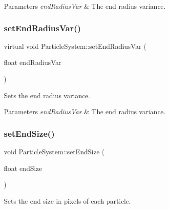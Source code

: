 \begin{DoxyParams}{Parameters}
{\em end\+Radius\+Var} & The end radius variance. \\
\hline
\end{DoxyParams}
\mbox{\label{classParticleSystem_ac342662b4a04cda94275239f9a810f73}} 
\subsubsection{\texorpdfstring{set\+End\+Radius\+Var()}{setEndRadiusVar()}\hspace{0.1cm}{\footnotesize\ttfamily [2/2]}}
{\footnotesize\ttfamily virtual void Particle\+System\+::set\+End\+Radius\+Var (\begin{DoxyParamCaption}\item[{float}]{end\+Radius\+Var }\end{DoxyParamCaption})\hspace{0.3cm}{\ttfamily [virtual]}}

Sets the end radius variance.


\begin{DoxyParams}{Parameters}
{\em end\+Radius\+Var} & The end radius variance. \\
\hline
\end{DoxyParams}
\mbox{\label{classParticleSystem_a729cc59e5e16918782be7a2892d0d4e5}} 
\subsubsection{\texorpdfstring{set\+End\+Size()}{setEndSize()}\hspace{0.1cm}{\footnotesize\ttfamily [1/2]}}
{\footnotesize\ttfamily void Particle\+System\+::set\+End\+Size (\begin{DoxyParamCaption}\item[{float}]{end\+Size }\end{DoxyParamCaption})\hspace{0.3cm}{\ttfamily [inline]}}

Sets the end size in pixels of each particle.


